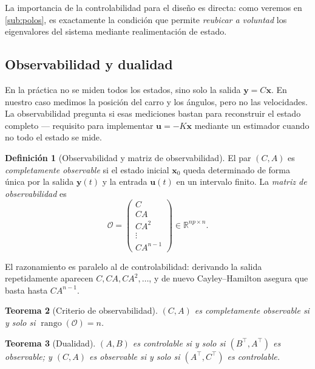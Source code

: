 \documentclass[11pt,letterpaper]{article}
\theoremstyle{definition}
\newtheorem{definicion}{Definición}[section]
\theoremstyle{plain}
\newtheorem{teorema}[definicion]{Teorema}
\theoremstyle{remark}
\DeclareMathOperator{\rank}{rango}
\newcommand{\R}{\mathbb{R}}
\newcommand{\calO}{\mathcal{O}}
\newcommand{\xv}{\bm{x}}
\newcommand{\uv}{\bm{u}}
\newcommand{\yv}{\bm{y}}
\begin{document}
La importancia de la controlabilidad para el diseño es directa: como
veremos en \cref{sub:polos}, es exactamente la condición que permite
\emph{reubicar a voluntad} los eigenvalores del sistema mediante
realimentación de estado.

\subsection{Observabilidad y dualidad}
\label{sub:obs}

En la práctica no se miden todos los estados, sino solo la salida
$\yv=C\xv$. En nuestro caso medimos la posición del carro y los ángulos,
pero no las velocidades. La observabilidad pregunta si esas mediciones
bastan para reconstruir el estado completo --- requisito para implementar
$\uv=-K\xv$ mediante un estimador cuando no todo el estado se mide.

\begin{definicion}[Observabilidad y matriz de observabilidad]
\label{def:obs}
El par $(C,A)$ es \emph{completamente observable} si el estado inicial
$\xv_0$ queda determinado de forma única por la salida $\yv(t)$ y la
entrada $\uv(t)$ en un intervalo finito. La \emph{matriz de
observabilidad} es
\begin{equation}\label{eq:Omat}
  \calO=\begin{pmatrix}C\\ CA\\ CA^2\\ \vdots\\ CA^{n-1}\end{pmatrix}
        \in\R^{np\times n}.
\end{equation}
\end{definicion}

El razonamiento es paralelo al de controlabilidad: derivando la salida
repetidamente aparecen $C,CA,CA^2,\dots$, y de nuevo Cayley--Hamilton
asegura que basta hasta $CA^{n-1}$.

\begin{teorema}[Criterio de observabilidad]
\label{thm:obs}
$(C,A)$ es completamente observable si y solo si $\rank(\calO)=n$.
\end{teorema}

\begin{teorema}[Dualidad]
\label{thm:dual}
$(A,B)$ es controlable si y solo si $(B^\top,A^\top)$ es observable; y
$(C,A)$ es observable si y solo si $(A^\top,C^\top)$ es controlable.
\end{teorema}
\end{document}
